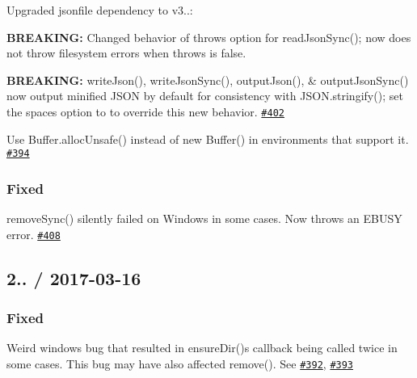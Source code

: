 \begin{DoxyItemize}
\item Upgraded jsonfile dependency to v3..\+:
\begin{DoxyItemize}
\item {\bfseries B\+R\+E\+A\+K\+I\+NG\+:} Changed behavior of {\ttfamily throws} option for {\ttfamily read\+Json\+Sync()}; now does not throw filesystem errors when {\ttfamily throws} is {\ttfamily false}.
\end{DoxyItemize}
\item {\bfseries B\+R\+E\+A\+K\+I\+NG\+:} {\ttfamily write\+Json()}, {\ttfamily write\+Json\+Sync()}, {\ttfamily output\+Json()}, \& {\ttfamily output\+Json\+Sync()} now output minified J\+S\+ON by default for consistency with {\ttfamily J\+S\+O\+N.\+stringify()}; set the {\ttfamily spaces} option to {} to override this new behavior. \href{https://github.com/jprichardson/node-fs-extra/pull/402}{\tt \#402}
\item Use {\ttfamily Buffer.\+alloc\+Unsafe()} instead of {\ttfamily new Buffer()} in environments that support it. \href{https://github.com/jprichardson/node-fs-extra/pull/394}{\tt \#394}
\end{DoxyItemize}

\subsubsection*{Fixed}


\begin{DoxyItemize}
\item {\ttfamily remove\+Sync()} silently failed on Windows in some cases. Now throws an {\ttfamily E\+B\+U\+SY} error. \href{https://github.com/jprichardson/node-fs-extra/pull/408}{\tt \#408}
\end{DoxyItemize}

\subsection*{2.. / 2017-\/03-\/16 }

\subsubsection*{Fixed}


\begin{DoxyItemize}
\item Weird windows bug that resulted in {\ttfamily ensure\+Dir()}\textquotesingle{}s callback being called twice in some cases. This bug may have also affected {\ttfamily remove()}. See \href{https://github.com/jprichardson/node-fs-extra/issues/392}{\tt \#392}, \href{https://github.com/jprichardson/node-fs-extra/pull/393}{\tt \#393}
\end{DoxyItemize}

